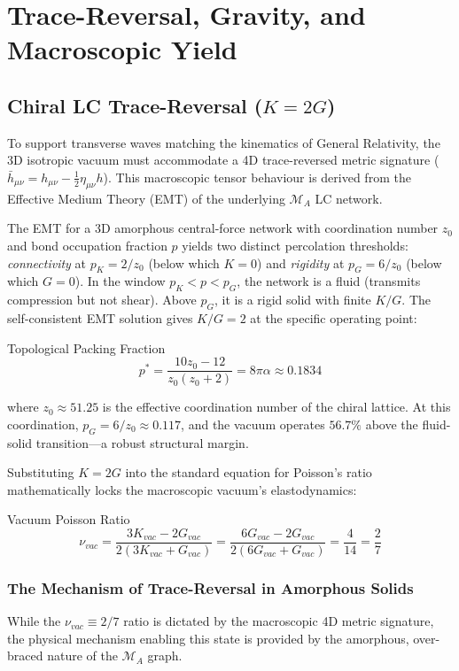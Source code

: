 \chapter{Trace-Reversal, Gravity, and Macroscopic Yield}
\label{ch:gravity_and_yield}

\section{Chiral LC Trace-Reversal ($K=2G$)}

To support transverse waves matching the kinematics of General Relativity, the 3D isotropic vacuum must accommodate a 4D trace-reversed metric signature ($\bar{h}_{\mu\nu} = h_{\mu\nu} - \frac{1}{2}\eta_{\mu\nu}h$). This macroscopic tensor behaviour is derived from the Effective Medium Theory (EMT) of the underlying $\mathcal{M}_A$ LC network.

The EMT for a 3D amorphous central-force network with coordination number $z_0$ and bond occupation fraction $p$ yields two distinct percolation thresholds: \textit{connectivity} at $p_K = 2/z_0$ (below which $K = 0$) and \textit{rigidity} at $p_G = 6/z_0$ (below which $G = 0$). In the window $p_K < p < p_G$, the network is a fluid (transmits compression but not shear). Above $p_G$, it is a rigid solid with finite $K/G$. The self-consistent EMT solution gives $K/G = 2$ at the specific operating point:
\begin{resultbox}{Topological Packing Fraction}
\begin{equation}
    p^* = \frac{10 z_0 - 12}{z_0(z_0 + 2)} = 8\pi\alpha \approx 0.1834
\end{equation}
\end{resultbox}
where $z_0 \approx 51.25$ is the effective coordination number of the chiral lattice. At this coordination, $p_G = 6/z_0 \approx 0.117$, and the vacuum operates $56.7\%$ above the fluid-solid transition---a robust structural margin.

Substituting $K = 2G$ into the standard equation for Poisson's ratio mathematically locks the macroscopic vacuum's elastodynamics:
\begin{resultbox}{Vacuum Poisson Ratio}
\begin{equation}
\nu_{vac} = \frac{3K_{vac} - 2G_{vac}}{2(3K_{vac} + G_{vac})} = \frac{6G_{vac} - 2G_{vac}}{2(6G_{vac} + G_{vac})} = \frac{4}{14} = \frac{2}{7}
\end{equation}
\end{resultbox}

\subsection{The Mechanism of Trace-Reversal in Amorphous Solids}
While the $\nu_{vac} \equiv 2/7$ ratio is dictated by the macroscopic 4D metric signature, the physical mechanism enabling this state is provided by the amorphous, over-braced nature of the $\mathcal{M}_A$ graph.

